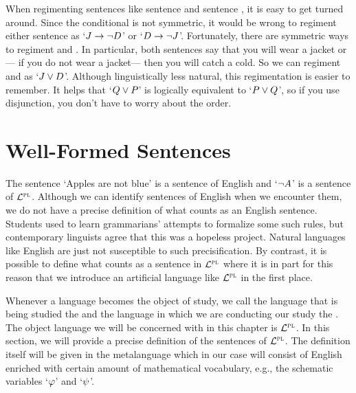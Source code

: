 When regimenting sentences like sentence  and sentence , it is easy to get turned around.
Since the conditional is not symmetric, it would be wrong to regiment either sentence as `$J \rightarrow \neg D$' or `$D \rightarrow \neg J$'.
Fortunately, there are symmetric ways to regiment  and .
In particular, both sentences say that you will wear a jacket or--- if you do not wear a jacket--- then you will catch a cold.
So we can regiment  and  as `$J \vee D$'.
Although linguistically less natural, this regimentation is easier to remember.
It helps that  `$Q \vee P$' is logically equivalent to `$P \vee Q$', so if you use disjunction, you don't have to worry about the order.
%
%
%





\section{Well-Formed Sentences}
  \label{sec:PLsentences}

The sentence `Apples are not blue' is a sentence of English and `$\neg A$' is a sentence of $\mathcal{L}^{\textsc{pl}}$.
Although we can identify sentences of English when we encounter them, we do not have a precise definition of what counts as an English sentence.
Students used to learn grammarians' attempts to formalize some such rules, but contemporary linguists agree that this was a hopeless project.
Natural languages like English are just not susceptible to such precisification.
By contrast, it is possible to define what counts as a sentence in $\mathcal{L}^{\textsc{pl}}$ where it is in part for this reason that we introduce an artificial language like $\mathcal{L}^{\textsc{pl}}$ in the first place.

Whenever a language becomes the object of study, we call the language that is being studied the  and the language in which we are conducting our study the . \label{def.metalanguage}
The object language we will be concerned with in this chapter is $\mathcal{L}^{\textsc{pl}}$.
In this section, we will provide a precise definition of the sentences of $\mathcal{L}^{\textsc{pl}}$. 
The definition itself will be given in the metalanguage which in our case will consist of English enriched with certain amount of mathematical vocabulary, e.g., the schematic variables `$\varphi$' and `$\psi$'.

